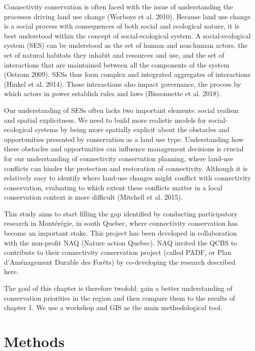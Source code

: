 Connectivity conservation is often faced with the issue of understanding the processes driving land use change (Worboys et al. 2010). Because land use change is a social process with consequences of both social and ecological nature, it is best understood within the concept of social-ecological system. A social-ecological system (SES) can be understood as the set of human and non-human actors, the set of natural habitats they inhabit and resources and use, and the set of interactions that are maintained between all the components of the system (Ostrom 2009). SESs thus form complex and integrated aggregates of interactions (Hinkel et al. 2014). Those interactions also impact governance, the process by which actors in power establish rules and laws (Bissonnette et al. 2018).

Our understanding of SESs often lacks two important elements: social realism and spatial explicitness.   We need to build more realistic models for social-ecological systems by being more spatially explicit about the obstacles and opportunities presented by conservation as a land use type. Understanding how these obstacles and opportunities can influence management decisions is crucial for our understanding of connectivity conservation planning, where land-use conflicts can hinder the protection and restoration of connectivity. Although it is relatively easy to identify where land-use changes might conflict with connectivity conservation, evaluating to which extent these conflicts matter in a local conservation context is more difficult (Mitchell et al. 2015).

This study aims to start filling the gap identified by conducting participatory research in Montérégie, in south Quebec, where connectivity conservation has become an important stake. This project has been developed in collaboration with the non-profit NAQ (Nature action Quebec). NAQ invited the QCBS to contribute to their connectivity conservation project (called PADF, or Plan d’Aménagement Durable des Forêts) by co-developing the research described here.

The goal of this chapter is therefore twofold: gain a better understanding of conservation priorities in the region and then compare them to the results of chapter 1. We use a workshop and GIS as the main methodological tool.\\

\section{Methods}

